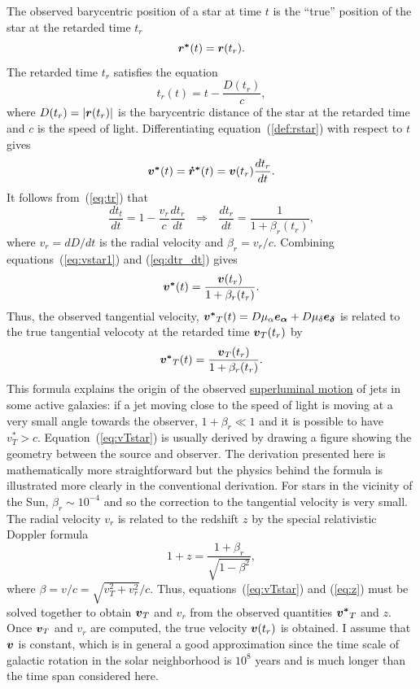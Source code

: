\documentclass[12pt]{article}
\newcommand \beq {\begin{equation}}
\newcommand \eeq {\end{equation}}
\newcommand{\ve}[1]{\mbox{\boldmath $#1$}}
\begin{document}
The observed barycentric position of a star at time $t$ is the ``true'' position 
of the star at the retarded time $t_r$ 
\beq
  \ve{r^*}(t) = \ve{r}(t_r) .
\label{def:rstar}
\eeq
The retarded time $t_r$ satisfies the equation 
\beq
  t_r(t) = t - \frac{D(t_r)}{c} ,
\label{eq:tr}
\eeq
where $D(t_r) = |\ve{r}(t_r)|$ is the barycentric distance of the star 
at the retarded time and $c$ is the speed of light. Differentiating 
equation~(\ref{def:rstar}) with respect 
to $t$ gives 
\beq
  \ve{v^*}(t) = \ve{\dot{r}^*}(t) = \ve{v}(t_r) \frac{d t_r}{dt} .
\label{eq:vstar1}
\eeq
It follows from~(\ref{eq:tr}) that 
\beq
  \frac{dt_t}{dt} = 1-\frac{v_r}{c} \frac{dt_r}{dt} \ \ \ \Rightarrow \ \ \ 
  \frac{dt_r}{dt} = \frac{1}{1+\beta_r(t_r)} ,
\label{eq:dtr_dt}
\eeq
where $v_r = d D/dt$ is the radial velocity and $\beta_r = v_r/c$. Combining 
equations~(\ref{eq:vstar1}) and (\ref{eq:dtr_dt}) gives 
\beq
  \ve{v^*}(t) = \frac{\ve{v}(t_r)}{1+\beta_r(t_r)} .
\eeq
Thus, the observed tangential velocity, $\ve{v^*}_T(t)=D\mu_{\alpha}\ve{e_{\alpha}} 
+ D \mu_{\delta} \ve{e_{\delta}}$ is related to the true 
tangential velocoty at the retarded time $\ve{v}_T(t_r)$ by 
\beq
   \ve{v^*}_T(t) = \frac{\ve{v}_T(t_r)}{1+\beta_r(t_r)} .
\label{eq:vTstar}
\eeq
This formula explains the origin of the observed 
\href{https://en.wikipedia.org/wiki/Superluminal_motion}{superluminal motion} 
of jets in some active galaxies: if a jet moving close to the speed of light 
is moving at a very small angle towards the observer, $1+\beta_r \ll 1$ and 
it is possible to have $v^*_T > c$. Equation~(\ref{eq:vTstar}) is usually derived by 
drawing a figure showing the geometry between the source and observer. 
The derivation presented here is mathematically more straightforward but 
the physics behind the formula is illustrated more clearly in the conventional 
derivation. For stars in the vicinity of the Sun, 
$\beta_r \sim 10^{-4}$ and so the correction to the tangential 
velocity is very small. The radial velocity $v_r$ is related to the redshift $z$ 
by the special relativistic Doppler formula 
\beq
  1 + z = \frac{1+\beta_r}{\sqrt{1-\beta^2}} ,
\label{eq:z}
\eeq
where $\beta = v/c = \sqrt{v_T^2+v_r^2}/c$. Thus, equations~(\ref{eq:vTstar}) 
and (\ref{eq:z}) must be solved together to obtain $\ve{v}_T$ and $v_r$ 
from the observed quantities $\ve{v^*}_T$ and $z$. Once $\ve{v}_T$ and 
$v_r$ are computed, the true velocity $\ve{v}(t_r)$ is obtained. I assume that 
$\ve{v}$ is constant, which is in general a good approximation since the time scale of 
galactic rotation in the solar neighborhood is $10^8$ years and is much longer 
than the time span considered here.
\end{document}
